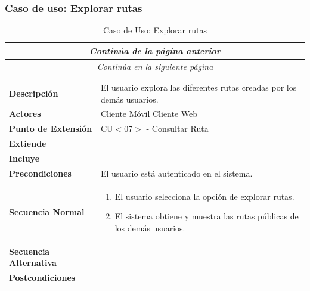 \subsubsection*{Caso de uso: Explorar rutas}
\begin{longtable}{| p{4cm} | p{10cm} |}
\endfirsthead
\multicolumn{2}{c}{\textit{Continúa de la página anterior}}\\[12pt]
\hline
\endhead
\hline
\multicolumn{2}{c}{\textit{Continúa en la siguiente página}} \\
\endfoot
\hline
\caption{Caso de Uso: Explorar rutas}\label{fig:1}\\
\endlastfoot


\hline
\multicolumn{2}{|c|}{\textbf{CU$<$04$>$ - Explorar Rutas}} \\

\hline
\textbf{Descripción} &
El usuario explora las diferentes rutas creadas por los demás usuarios.\\

\hline
\textbf{Actores} &
Cliente Móvil\newline
Cliente Web\\

\hline
\textbf{Punto de Extensión} &
CU$<$07$>$ - Consultar Ruta
\\

\hline
\textbf{Extiende} &
\\

\hline
\textbf{Incluye} &
\\

\hline
\textbf{Precondiciones} &
El usuario está autenticado en el sistema.\\

\hline
\textbf{Secuencia Normal} &\mbox{}\par\vspace{-\baselineskip}
\begin{enumerate}[leftmargin=0.7cm, topsep=0.1cm]
\item El usuario selecciona la opción de explorar rutas.
\item El sistema obtiene y muestra las rutas públicas de los demás usuarios.
\end{enumerate}\\

\hline
\textbf{Secuencia Alternativa} &\mbox{}\par\vspace{-\baselineskip}
\\

\hline
\textbf{Postcondiciones} & 
\\
\hline
\end{longtable}



